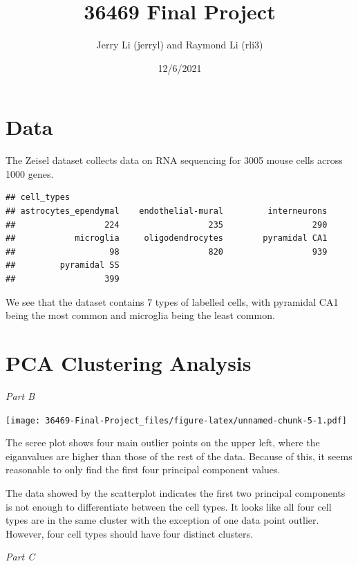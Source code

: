 \documentclass[]{article}
\title{36469 Final Project}
\author{Jerry Li (jerryl) and Raymond Li (rli3)}
\date{12/6/2021}
\begin{document}
\maketitle

\hypertarget{data}{%
\section{Data}\label{data}}

The Zeisel dataset collects data on RNA sequencing for 3005 mouse cells
across 1000 genes.

\begin{verbatim}
## cell_types
## astrocytes_ependymal    endothelial-mural         interneurons 
##                  224                  235                  290 
##            microglia     oligodendrocytes        pyramidal CA1 
##                   98                  820                  939 
##         pyramidal SS 
##                  399
\end{verbatim}

We see that the dataset contains 7 types of labelled cells, with
pyramidal CA1 being the most common and microglia being the least
common.

\hypertarget{pca-clustering-analysis}{%
\section{PCA Clustering Analysis}\label{pca-clustering-analysis}}

\emph{Part B}

\texttt{[image: 36469-Final-Project\_files/figure-latex/unnamed-chunk-5-1.pdf]}

The scree plot shows four main outlier points on the upper left, where
the eiganvalues are higher than those of the rest of the data. Because
of this, it seems reasonable to only find the first four principal
component values.

The data showed by the scatterplot indicates the first two principal
components is not enough to differentiate between the cell types. It
looks like all four cell types are in the same cluster with the
exception of one data point outlier. However, four cell types should
have four distinct clusters.

\emph{Part C}
\end{document}
